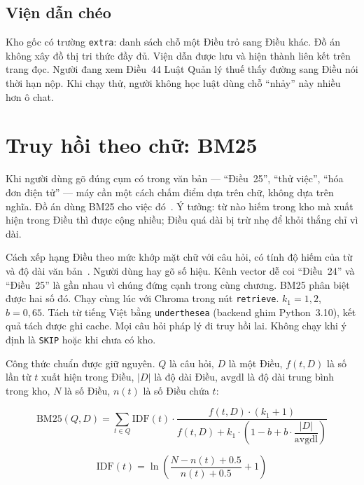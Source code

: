 \subsection{Viện dẫn chéo}

Kho gốc có trường \texttt{extra}: danh sách chỗ một Điều trỏ sang Điều khác. Đồ
án không xây đồ thị tri thức đầy đủ. Viện dẫn được lưu và hiện thành liên kết
trên trang đọc. Người đang xem Điều~44 Luật Quản lý thuế thấy đường sang Điều
nói thời hạn nộp. Khi chạy thử, người không học luật dùng chỗ ``nhảy'' này
nhiều hơn ô chat.

\section{Truy hồi theo chữ: BM25}

Khi người dùng gõ đúng cụm có trong văn bản --- ``Điều~25'', ``thử việc'',
``hóa đơn điện tử'' --- máy cần một cách chấm điểm dựa trên chữ, không dựa trên
nghĩa. Đồ án dùng BM25 cho việc đó~\cite{robertson2009bm25}. Ý tưởng: từ nào
hiếm trong kho mà xuất hiện trong Điều thì được cộng nhiều; Điều quá dài bị trừ
nhẹ để khỏi thắng chỉ vì dài.

\boncau
{Cách xếp hạng Điều theo mức khớp mặt chữ với câu hỏi, có tính độ hiếm của từ
và độ dài văn bản~\cite{robertson2009bm25}.}
{Người dùng hay gõ số hiệu. Kênh vector dễ coi ``Điều~24'' và ``Điều~25'' là
gần nhau vì chúng đứng cạnh trong cùng chương. BM25 phân biệt được hai số đó.}
{Chạy cùng lúc với Chroma trong nút \texttt{retrieve}. $k_1 = 1{,}2$,
$b = 0{,}65$. Tách từ tiếng Việt bằng \texttt{underthesea} (backend ghim
Python~3.10), kết quả tách được ghi cache.}
{Mọi câu hỏi pháp lý đi truy hồi lai. Không chạy khi ý định là \texttt{SKIP}
hoặc khi chưa có kho.}

Công thức chuẩn được giữ nguyên. $Q$ là câu hỏi, $D$ là một Điều, $f(t,D)$ là
số lần từ $t$ xuất hiện trong Điều, $|D|$ là độ dài Điều, $\mathrm{avgdl}$ là
độ dài trung bình trong kho, $N$ là số Điều, $n(t)$ là số Điều chứa $t$:

\begin{equation}
\label{eq:bm25}
\mathrm{BM25}(Q, D) = \sum_{t \in Q} \mathrm{IDF}(t) \cdot
\frac{f(t, D) \cdot (k_1 + 1)}
     {f(t, D) + k_1 \cdot \left(1 - b + b \cdot \dfrac{|D|}{\mathrm{avgdl}}\right)}
\end{equation}

\begin{equation}
\label{eq:idf}
\mathrm{IDF}(t) = \ln\left(\frac{N - n(t) + 0.5}{n(t) + 0.5} + 1\right)
\end{equation}

